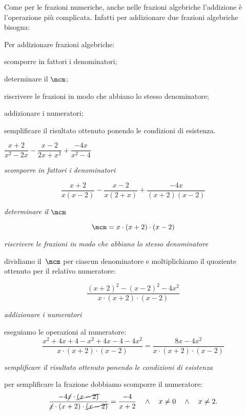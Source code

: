 Come per le frazioni numeriche, anche nelle frazioni algebriche l'addizione
è l'operazione più complicata. Infatti per addizionare due frazioni algebriche 
bisogna:

\begin{procedura}
 Per addizionare frazioni algebriche:
\begin{enumeratea}
\item scomporre in fattori i denominatori;
\item determinare il $\mcm$;
\item riscrivere le frazioni in modo che abbiano lo stesso denominatore;
\item addizionare i numeratori;
\item semplificare il risultato ottenuto ponendo le condizioni di esistenza.
\end{enumeratea}
\end{procedura}

 \begin{esempio}
$\dfrac{x+2}{x^{2}-2x}-\dfrac{x-2}{2x+x^{2}}+\dfrac{-4x}{x^{2}-4}$
\begin{enumeratea}
 \item \emph{scomporre in fattori i denominatori}
 
  \[\frac{x+2}{x(x-2)}-\frac{x-2}{x(2+x)}+\frac{-4x}{(x+2)(x-2)}\]
  
 \item \emph{determinare il $\mcm$}
 
  \[\mcm = x\cdot (x+2) \cdot (x-2)\]
  

 \item \emph{riscrivere le frazioni in modo che abbiano lo stesso denominatore}
 
  dividiamo il~$\mcm$ per ciascun denominatore e moltiplichiamo il 
  quoziente ottenuto per il relativo numeratore:
  
    \[\frac{(x+2)^{2}-(x-2)^{2}-4x^{2}}{x\cdot(x+2)\cdot(x-2)}\]
    
 \item \emph{addizionare i numeratori} 
 
  eseguiamo le operazioni al numeratore:
    \begin{equation*}
     \frac{x^{2}+4x+4-x^{2}+4x-4-4x^{2}}{x\cdot(x+2)\cdot(x-2)}=
     \frac{8x-4x^{2}}{x\cdot(x+2)\cdot(x-2)}
     \end{equation*}
     
 \item \emph{semplificare il risultato ottenuto ponendo le condizioni di 
  esistenza}
 
  per semplificare la frazione dobbiamo scomporre il numeratore:
    \begin{equation*}
    \frac{-4\cancel{x}\cdot\cancel{(x-2)}}
         {\cancel{x}\cdot(x+2)\cdot\cancel{(x-2)}}=
    \frac{-4}{x+2} \quad \wedge \quad x \neq 0 \quad \wedge \quad x \neq 2.
    \end{equation*}
\end{enumeratea}
 \end{esempio}

